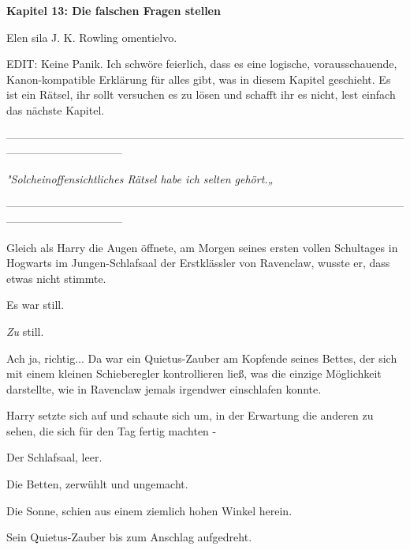 

\hypertarget{die-falschen-fragen-stellen}{%

\textbf{Kapitel 13: Die falschen Fragen stellen\\ }

\hfill\break Elen sila J. K. Rowling omentielvo.

EDIT: Keine Panik. Ich schwöre feierlich, dass es eine logische, vorausschauende, Kanon-kompatible Erklärung für alles gibt, was in diesem Kapitel geschieht. Es ist ein Rätsel, ihr sollt versuchen es zu lösen und schafft ihr es nicht, lest einfach das nächste Kapitel.

--------------------------------------------------------------------------------------------------------------------------------------------

\hfill\break

\emph{\emph{"}\emph{Solch}\emph{ein}\emph{offensichtlich}\emph{es Rätsel habe ich selten gehört.„}}

\hfill\break

--------------------------------------------------------------------------------------------------------------------------------------------

\hfill\break Gleich als Harry die Augen öffnete, am Morgen seines ersten vollen Schultages in Hogwarts im Jungen-Schlafsaal der Erstklässler von Ravenclaw, wusste er, dass etwas nicht stimmte.

Es war still.

\emph{Zu} still.

Ach ja, richtig... Da war ein Quietus-Zauber am Kopfende seines Bettes, der sich mit einem kleinen Schieberegler kontrollieren ließ, was die einzige Möglichkeit darstellte, wie in Ravenclaw jemals irgendwer einschlafen konnte.

Harry setzte sich auf und schaute sich um, in der Erwartung die anderen zu sehen, die sich für den Tag fertig machten -

Der Schlafsaal, leer.

Die Betten, zerwühlt und ungemacht.

Die Sonne, schien aus einem ziemlich hohen Winkel herein.

Sein Quietus-Zauber bis zum Anschlag aufgedreht.

}
